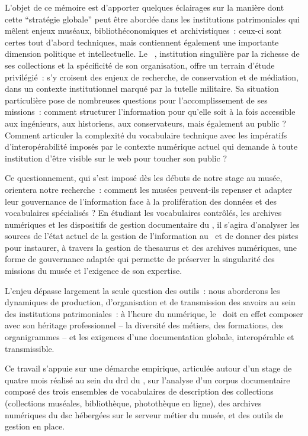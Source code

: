 L’objet de ce mémoire est d'apporter quelques éclairages sur la manière dont cette \enquote{stratégie globale} peut être abordée dans les institutions patrimoniales qui mêlent enjeux muséaux, bibliothéconomiques et archivistiques~: ceux-ci sont certes tout d'abord techniques, mais contiennent également une importante dimension politique et intellectuelle. Le \maelong~, institution singulière par la richesse de ses collections et la spécificité de son organisation, offre un terrain d’étude privilégié~: s'y croisent des enjeux de recherche, de conservation et de médiation, dans un contexte institutionnel marqué par la tutelle militaire. Sa situation particulière pose de nombreuses questions pour l'accomplissement de ses missions~: comment structurer l’information pour qu’elle soit à la fois accessible aux ingénieurs, aux historiens, aux conservateurs, mais également au public ? Comment articuler la complexité du vocabulaire technique avec les impératifs d’interopérabilité imposés par le contexte numérique actuel qui demande à toute institution d'être visible sur le web pour toucher son public ?



\bigskip


Ce questionnement, qui s’est imposé dès les débuts de notre stage au musée, orientera notre recherche~: comment les musées peuvent-ils repenser et adapter leur gouvernance de l’information face à la prolifération des données et des vocabulaires spécialisés ? En étudiant les vocabulaires contrôlés, les archives numériques et les dispositifs de gestion documentaire du \mae, il s’agira d'analyser les sources de l'état actuel de la gestion de l'information au \mae~et de donner des pistes pour instaurer, à travers la gestion de \gls{thesaurus} et des archives numériques, une forme de gouvernance adaptée qui permette de préserver la singularité des missions du musée et l’exigence de son expertise.

L’enjeu dépasse largement la seule question des outils~: nous aborderons les dynamiques de production, d’organisation et de transmission des savoirs au sein des institutions patrimoniales~: à l’heure du numérique, le \mae~doit en effet composer avec son héritage professionnel – la diversité des métiers, des formations, des organigrammes – et les exigences d’une documentation globale, interopérable et transmissible.

\bigskip

Ce travail s’appuie sur une démarche empirique, articulée autour d’un stage de quatre mois réalisé au sein du \acf{drd} du \mae, sur l’analyse d’un corpus documentaire composé des trois ensembles de vocabulaires de description des collections (collections muséales, bibliothèque, photothèque en ligne), des archives numériques du \acf{dsc} hébergées sur le serveur métier du musée, et des outils de gestion en place. 

